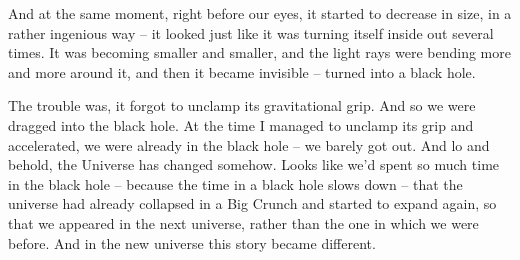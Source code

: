 \documentclass[ebook,oneside,final,openright]{memoir}
\begin{document}
\par
And at the same moment, right before our eyes, it started to decrease in size, in a rather ingenious way – it looked just like it was turning itself inside out several times. It was becoming smaller and smaller, and the light rays were bending more and more around it, and then it became invisible – turned into a black hole.\par
\par
The trouble was, it forgot to unclamp its gravitational grip. And so we were dragged into the black hole. At the time I managed to unclamp its grip and accelerated, we were already in the black hole – we barely got out. And lo and behold, the Universe has changed somehow. Looks like we’d spent so much time in the black hole – because the time in a black hole slows down – that the universe had already collapsed in a Big Crunch and started to expand again, so that we appeared in the next universe, rather than the one in which we were before. And in the new universe this story became different.
\end{document}
